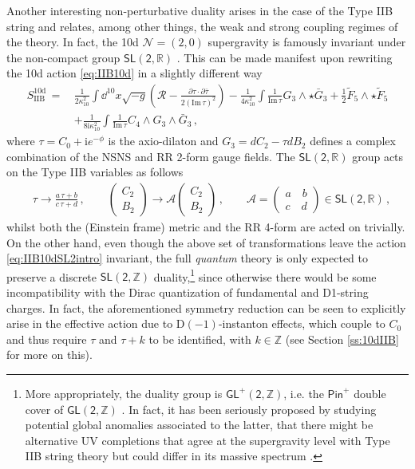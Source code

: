 Another interesting non-perturbative duality arises in the case of the Type IIB string and relates, among other things, the weak and strong coupling regimes of the theory. In fact, the 10d $\mathcal{N}=(2,0)$ supergravity is famously invariant under the non-compact group $\mathsf{SL (2,\mathbb{R})}$ \cite{Schwarz:1995dk}. This can be made manifest upon rewriting the 10d action \eqref{eq:IIB10d} in a slightly different way
%
\begin{equation}\label{eq:IIB10dSL2intro}
	\begin{aligned}
			S_\text{IIB}^{\text{10d}}\, =\, & \frac{1}{2\kappa_{10}^2} \int \dd^{10}x\sqrt{-g} \left(\mathcal{R}-\frac{\partial \tau \cdot \partial \bar \tau}{2 (\text{Im}\, \tau)^2}\right) -\frac{1}{4\kappa_{10}^2}\int \frac{1}{\text{Im}\, \tau} G_3\wedge \star \bar{G}_3 + \frac{1}{2} \tilde F_5 \wedge \star \tilde F_5\\
			&+\frac{1}{8 \text{i} \kappa_{10}^2}\int \frac{1}{\text{Im}\, \tau} C_4\wedge G_3 \wedge \bar{G}_3\, ,
	\end{aligned}
\end{equation}
%
where $\tau=C_0 + \text{i} e^{-\phi}$ is the axio-dilaton and $G_3=dC_2 - \tau dB_2$ defines a complex combination of the NSNS and RR 2-form gauge fields. The $\mathsf{SL (2,\mathbb{R})}$ group acts on the Type IIB variables as follows
%
\begin{align}\label{eq:Sdualityrules10dIIB}
	&\tau \rightarrow \frac{a\, \tau + b}{c\, \tau+d}\,,\qquad \begin{pmatrix}
		C_2\\ B_2
	\end{pmatrix}
	\rightarrow \mathcal{A} \begin{pmatrix}
		C_2\\ B_2
	\end{pmatrix}\, , \qquad \mathcal{A}= \begin{pmatrix}
		a \quad  b\\c \quad  d
	\end{pmatrix} \in \mathsf{SL (2,\mathbb{R})}\, ,
\end{align}
%
whilst both the (Einstein frame) metric and the RR 4-form are acted on trivially.  On the other hand, even though the above set of transformations leave the action \eqref{eq:IIB10dSL2intro} invariant, the full \emph{quantum} theory is only expected to preserve a discrete $\mathsf{SL (2,\mathbb{Z})}$ duality,\footnote{More appropriately, the duality group is $\mathsf{GL^+(2, \mathbb{Z})}$, i.e. the $\mathsf{Pin}^+$ double cover of $\mathsf{GL(2, \mathbb{Z})}$ \cite{Tachikawa:2018njr}. In fact, it has been seriously proposed by studying potential global anomalies associated to the latter, that there might be alternative UV completions that agree at the supergravity level with Type IIB string theory but could differ in its massive spectrum \cite{Debray:2021vob}.} since otherwise there would be some incompatibility with the Dirac quantization of fundamental and D1-string charges. In fact, the aforementioned symmetry reduction can be seen to explicitly arise in the effective action due to D$(-1)$-instanton effects, which couple to $C_0$ and thus require $\tau$ and $\tau + k$ to be identified, with $k \in \mathbb{Z}$ (see Section \ref{ss:10dIIB} for more on this).

